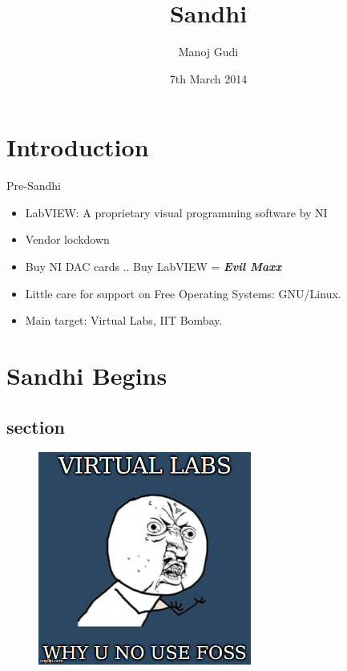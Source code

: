 \documentclass{beamer}
\title[Sandhi]{Sandhi}
\author{Manoj Gudi}
\institute{R.A. FOSSEE | NME-ICT | IIT Bombay}
\date{7th March 2014}
\begin{document}
\begin{frame}
  \titlepage
\end{frame}


\section{Introduction}

\begin{frame}{Pre-Sandhi}

\begin{itemize}
  \item LabVIEW: A proprietary visual programming software by NI
  \item Vendor lockdown 
  \item Buy NI DAC cards .. Buy LabVIEW  = \textbf{ \textit{Evil Maxx}}
  \item Little care for support on Free Operating Systems: GNU/Linux.
  \item Main target: Virtual Labs, IIT Bombay.
\end{itemize}
\vskip 1cm
\end{frame}

\section{Sandhi Begins}
\vskip 1cm
\begin{frame}{}
\subsection{section}
\begin{figure} [ht!]
	\centering
	\includegraphics[width=70mm]{meme1.jpg}
\end{figure}
\end{frame}
\end{document}

